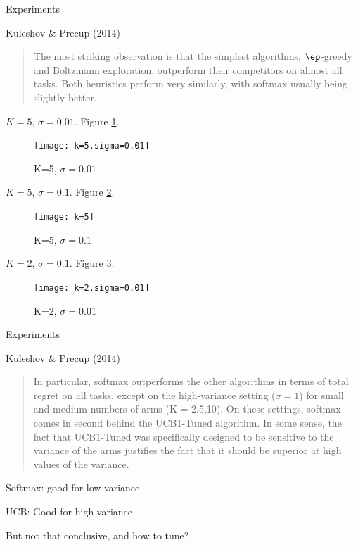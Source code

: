 \documentclass[english]{article}
\begin{document}
\item {Experiments}
\bitem
\item Kuleshov \& Precup (2014)
\begin{quote}
The most striking observation is that the simplest algorithms, $\ep$-greedy and Boltzmann exploration, outperform their competitors on almost all tasks. Both heuristics perform very similarly, with softmax usually being slightly better. 
\end{quote}
\eitem



\item {$K=5$, $\sigma=0.01$}. Figure \ref{K=5.sigma=0.01}.
\begin{figure}[h!]
\begin{center}
\texttt{[image: k=5.sigma=0.01]}
    \caption{K=5, $\sigma=0.01$}
    \label{K=5.sigma=0.01}
\end{center}
\end{figure}



\item {$K=5$, $\sigma=0.1$}. Figure \ref{K=5.sigma=0.1}.
\begin{figure}[h!]
\begin{center}
\texttt{[image: k=5]}
    \caption{K=5, $\sigma=0.1$}
    \label{K=5.sigma=0.1}
\end{center}
\end{figure}



\item {$K=2$, $\sigma=0.1$}. Figure \ref{K=2.sigma=0.01}.
\begin{figure}[h!]
\begin{center}
\texttt{[image: k=2.sigma=0.01]}
    \caption{K=2, $\sigma=0.01$}
    \label{K=2.sigma=0.01}
\end{center}
\end{figure}




\item {Experiments}
\bitem
\item Kuleshov \& Precup (2014)
\begin{quote}
In particular, softmax outperforms the other algorithms in terms of total regret on all tasks, except on the high-variance setting ($\sigma = 1$) for small and medium numbers of arms (K = 2,5,10). On these settings, softmax comes in second behind the UCB1-Tuned algorithm. In some sense, the fact that UCB1-Tuned was specifically designed to be sensitive to the variance of the arms justifies the fact
that it should be superior at high values of the variance.
\end{quote}
\item Softmax: good for low variance
\item UCB: Good for high variance
\item But not that conclusive, and how to tune?
\eitem
\end{document}

